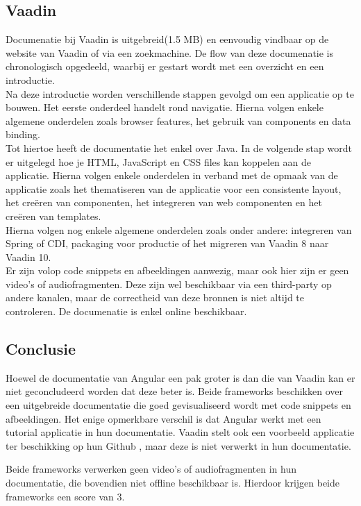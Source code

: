 \subsection{Vaadin}
Documenatie bij Vaadin is uitgebreid(1.5 MB) en eenvoudig vindbaar op de website van Vaadin of via een zoekmachine. De flow van deze documenatie is chronologisch opgedeeld, waarbij er gestart wordt met een overzicht en een introductie. \\
Na deze introductie worden verschillende stappen gevolgd om een applicatie op te bouwen. Het eerste onderdeel handelt rond navigatie. Hierna volgen enkele algemene onderdelen zoals browser features, het gebruik van components en data binding. \\ 
Tot hiertoe heeft de documentatie het enkel over Java. In de volgende stap wordt er uitgelegd hoe je HTML, JavaScript en CSS files kan koppelen aan de applicatie. 
Hierna volgen enkele onderdelen in verband met de opmaak van de applicatie zoals het thematiseren van de applicatie voor een consistente layout, het creëren van componenten, het integreren van web componenten en het creëren van templates. \\
Hierna volgen nog enkele algemene onderdelen zoals onder andere: integreren van Spring of CDI, packaging voor productie of het migreren van Vaadin 8 naar Vaadin 10. \\

Er zijn volop code snippets en afbeeldingen aanwezig, maar ook hier zijn er geen video's of audiofragmenten. Deze zijn wel beschikbaar via een third-party op andere kanalen, maar de correctheid van deze bronnen is niet altijd te controleren. De documenatie is enkel online beschikbaar.

\subsection{Conclusie}
Hoewel de documentatie van Angular een pak groter is dan die van Vaadin kan er niet geconcludeerd worden dat deze beter is. Beide frameworks beschikken over een uitgebreide documentatie die goed gevisualiseerd wordt met code snippets en afbeeldingen. Het enige opmerkbare verschil is dat Angular werkt met een tutorial applicatie in hun documentatie. Vaadin stelt ook een voorbeeld applicatie ter beschikking op hun Github \autocite{VaadinDemo2019}, maar deze is niet verwerkt in hun documentatie.

Beide frameworks verwerken geen video's of audiofragmenten in hun documentatie, die bovendien niet offline beschikbaar is. Hierdoor krijgen beide frameworks een score van 3.

